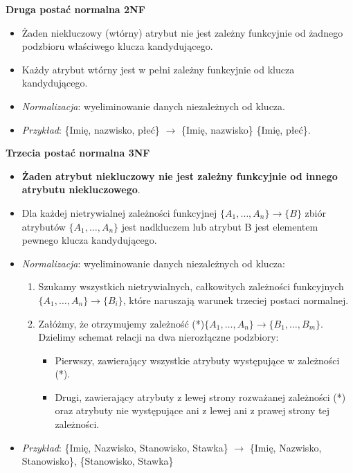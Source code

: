 \documentclass[main.tex]{subfiles}
\begin{document}
    \noindent \textbf{Druga postać normalna 2NF}
    \begin{itemize}[noitemsep]
        \item Żaden niekluczowy (wtórny) atrybut nie jest zależny funkcyjnie od żadnego podzbioru właściwego klucza kandydującego.
        \item Każdy atrybut wtórny jest w pełni zależny funkcyjnie od klucza kandydującego.
        \item \textit{Normalizacja}: wyeliminowanie danych niezależnych od klucza.
        \item \textit{Przykład}: \{Imię, nazwisko, płeć\} $\rightarrow$ \{Imię, nazwisko\} \{Imię, płeć\}.
    \end{itemize}

    \noindent \textbf{Trzecia postać normalna 3NF}
    \begin{itemize}[noitemsep]
        \item \textbf{Żaden atrybut niekluczowy nie jest zależny funkcyjnie od innego atrybutu niekluczowego}.
        \item Dla każdej nietrywialnej zależności funkcyjnej $\{A_1,\dots,A_n\} \rightarrow \{B\}$ zbiór atrybutów $\{A_1,\dots,A_n\}$ jest nadkluczem lub atrybut B jest elementem pewnego klucza kandydującego.
        \item \textit{Normalizacja}: wyeliminowanie danych niezależnych od klucza:
        \begin{enumerate}[noitemsep]
            \item Szukamy wszystkich nietrywialnych, całkowitych zależności funkcyjnych $\{A_1,\dots,A_n\} \rightarrow \{B_i\}$, które naruszają warunek trzeciej postaci normalnej.
            \item Załóżmy, że otrzymujemy zależność (*)$\{A_1,\dots,A_n\} \rightarrow \{B_1, \dots, B_m\}$. Dzielimy schemat relacji na dwa nierozłączne podzbiory:
            \begin{itemize}
                \item Pierwszy, zawierający wszystkie atrybuty występujące w zależności (*).
                \item Drugi, zawierający atrybuty z lewej strony rozważanej zależności (*) oraz atrybuty nie występujące ani z lewej ani z prawej strony tej zależności.
            \end{itemize}
        \end{enumerate}
        \item \textit{Przykład}: \{Imię, Nazwisko, Stanowisko, Stawka\} $\rightarrow$ \{Imię, Nazwisko, Stanowisko\},
        \{Stanowisko, Stawka\}
    \end{itemize}
\end{document}
